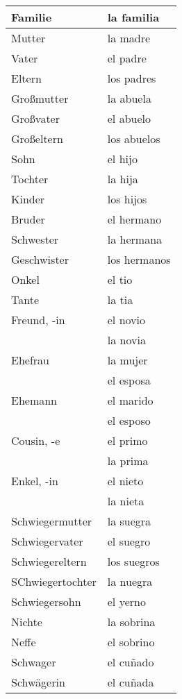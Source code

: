 \documentclass[10pt,spanish]{article}
\begin{document}
\begin{longtable}{p{} | p{}} 
\textbf{Familie}     & \textbf{la familia}                                       \\ \hline
\hline
\endhead %
Mutter &  la madre \\
Vater & el padre \\
Eltern & los padres \\
Großmutter & la abuela \\
Großvater & el abuelo \\
Großeltern & los abuelos \\
Sohn & el hijo \\
Tochter & la hija \\
Kinder & los hijos \\
Bruder & el hermano \\
Schwester & la hermana \\
Geschwister & los hermanos \\
Onkel & el tio \\
Tante & la tia \\
Freund, -in & el novio \\
            & la novia \\
Ehefrau & la mujer \\
        & el esposa \\
Ehemann & el marido \\
        & el esposo \\
Cousin, -e & el primo \\
           & la prima \\
Enkel, -in & el nieto \\
           & la nieta \\
Schwiegermutter & la suegra \\
Schwiegervater & el suegro \\
Schwiegereltern & los suegros \\
SChwiegertochter & la nuegra \\
Schwiegersohn & el yerno \\
Nichte & la sobrina \\
Neffe & el sobrino \\
Schwager & el cu\~{n}ado\\
Schwägerin & el cu\~{n}ada

\end{longtable}
\end{document}
